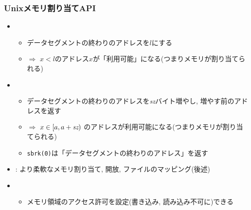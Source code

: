 \documentclass[12pt,dvipdfmx]{beamer}
\begin{document}
\begin{frame}
  \frametitle{Unixメモリ割り当てAPI}
  \begin{itemize}
  \item {}
    \begin{itemize}
    \item データセグメントの終わりのアドレスを$l$にする
    \item $\Rightarrow$ $x < l$のアドレス$x$が「利用可能」になる(つまりメモリが割り当てられる)
    \end{itemize}
  \item {}
    \begin{itemize}
    \item データセグメントの終わりのアドレスを{\it sz}バイト増やし,
      増やす前のアドレスを返す
    \item $\Rightarrow$ $x \in [a, a+\mbox{\it sz})$
      のアドレスが利用可能になる(つまりメモリが割り当てられる)
    \item {\tt sbrk(0)}は「データセグメントの終わりのアドレス」を返す
    \end{itemize}
  \item {} : より柔軟なメモリ割り当て, 開放, ファイルのマッピング(後述)
  \item {}
    \begin{itemize}
    \item メモリ領域のアクセス許可を設定(書き込み, 読み込み不可に)できる
    \end{itemize}
  \end{itemize}
\end{frame}
\end{document}
